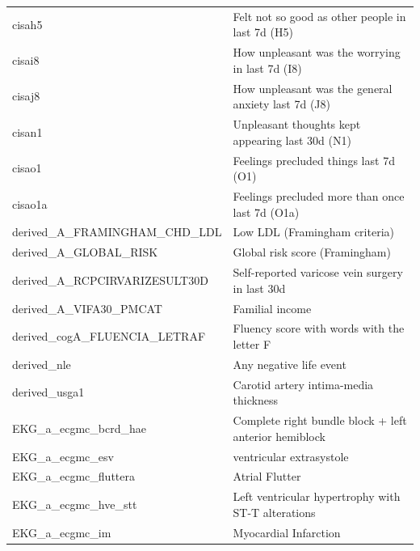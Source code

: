 \begin{table}[H]
\begin{center}
\begin{tabular}{l|l}
            cisah5                            & Felt not so good as other people in last 7d (H5)      \\
            cisai8                            & How unpleasant was the worrying in last 7d (I8)       \\
            cisaj8                            & How unpleasant was the general anxiety last 7d (J8)   \\
            cisan1                            & Unpleasant thoughts kept appearing last 30d (N1)      \\
            cisao1                            & Feelings precluded things last 7d (O1)                \\
            cisao1a                           & Feelings precluded more than once last 7d (O1a)       \\
            derived\_A\_FRAMINGHAM\_CHD\_LDL  & Low LDL (Framingham criteria)                         \\
            derived\_A\_GLOBAL\_RISK          & Global risk score (Framingham)                        \\
            derived\_A\_RCPCIRVARIZESULT30D   & Self-reported varicose vein surgery in last 30d       \\
            derived\_A\_VIFA30\_PMCAT         & Familial income                                       \\
            derived\_cogA\_FLUENCIA\_LETRAF   & Fluency score with words with the letter F            \\
            derived\_nle                      & Any negative life event                               \\
            derived\_usga1                    & Carotid artery intima-media thickness                 \\
            EKG\_a\_ecgmc\_bcrd\_hae          & Complete right bundle block + left anterior hemiblock \\
            EKG\_a\_ecgmc\_esv                & ventricular extrasystole                              \\
            EKG\_a\_ecgmc\_fluttera           & Atrial Flutter                                        \\
            EKG\_a\_ecgmc\_hve\_stt           & Left ventricular hypertrophy with ST-T alterations    \\
            EKG\_a\_ecgmc\_im                 & Myocardial Infarction                                 \\

\end{tabular}
\end{center}
\end{table}
